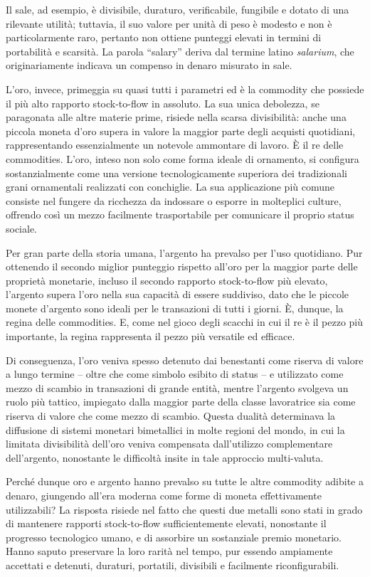 \documentclass[
  a5paper,
  smalldemyvopaper,10pt,twoside,onecolumn,openright,extrafontsizes,hidelinks]{memoir}
\begin{document}
Il sale, ad esempio, è divisibile, duraturo, verificabile, fungibile e
dotato di una rilevante utilità; tuttavia, il suo valore per unità di
peso è modesto e non è particolarmente raro, pertanto non ottiene
punteggi elevati in termini di portabilità e scarsità. La parola
``salary'' deriva dal termine latino \emph{salarium}, che
originariamente indicava un compenso in denaro misurato in sale.

L'oro, invece, primeggia su quasi tutti i parametri ed è la commodity
che possiede il più alto rapporto stock-to-flow in assoluto. La sua
unica debolezza, se paragonata alle altre materie prime, risiede nella
scarsa divisibilità: anche una piccola moneta d'oro supera in valore la
maggior parte degli acquisti quotidiani, rappresentando essenzialmente
un notevole ammontare di lavoro. È il re delle commodities. L'oro,
inteso non solo come forma ideale di ornamento, si configura
sostanzialmente come una versione tecnologicamente superiora dei
tradizionali grani ornamentali realizzati con conchiglie. La sua
applicazione più comune consiste nel fungere da ricchezza da indossare o
esporre in molteplici culture, offrendo così un mezzo facilmente
trasportabile per comunicare il proprio status sociale.

Per gran parte della storia umana, l'argento ha prevalso per l'uso
quotidiano. Pur ottenendo il secondo miglior punteggio rispetto all'oro
per la maggior parte delle proprietà monetarie, incluso il secondo
rapporto stock-to-flow più elevato, l'argento supera l'oro nella sua
capacità di essere suddiviso, dato che le piccole monete d'argento sono
ideali per le transazioni di tutti i giorni. È, dunque, la regina delle
commodities. E, come nel gioco degli scacchi in cui il re è il pezzo più
importante, la regina rappresenta il pezzo più versatile ed efficace.

Di conseguenza, l'oro veniva spesso detenuto dai benestanti come riserva
di valore a lungo termine -- oltre che come simbolo esibito di status --
e utilizzato come mezzo di scambio in transazioni di grande entità,
mentre l'argento svolgeva un ruolo più tattico, impiegato dalla maggior
parte della classe lavoratrice sia come riserva di valore che come mezzo
di scambio. Questa dualità determinava la diffusione di sistemi monetari
bimetallici in molte regioni del mondo, in cui la limitata divisibilità
dell'oro veniva compensata dall'utilizzo complementare dell'argento,
nonostante le difficoltà insite in tale approccio multi-valuta.

Perché dunque oro e argento hanno prevalso su tutte le altre commodity
adibite a denaro, giungendo all'era moderna come forme di moneta
effettivamente utilizzabili? La risposta risiede nel fatto che questi
due metalli sono stati in grado di mantenere rapporti stock-to-flow
sufficientemente elevati, nonostante il progresso tecnologico umano, e
di assorbire un sostanziale premio monetario. Hanno saputo preservare la
loro rarità nel tempo, pur essendo ampiamente accettati e detenuti,
duraturi, portatili, divisibili e facilmente riconfigurabili.
\end{document}
